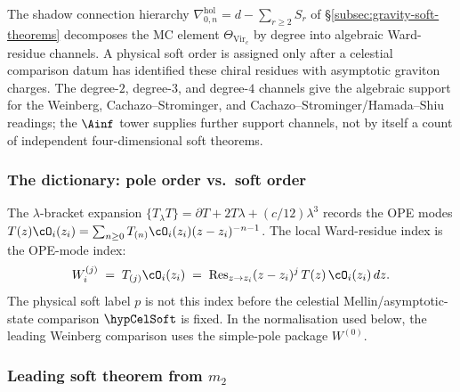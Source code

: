 The shadow connection hierarchy
$\nabla^{\mathrm{hol}}_{0,n} = d - \sum_{r \ge 2} S_r$
of \S\ref{subsec:gravity-soft-theorems}
decomposes the MC element $\Theta_{\mathrm{Vir}_c}$
by degree into algebraic Ward-residue channels. A physical soft
order is assigned only after a celestial comparison datum has
identified these chiral residues with asymptotic graviton charges.
The degree-$2$, degree-$3$, and degree-$4$ channels give the
algebraic support for the Weinberg, Cachazo--Strominger, and
Cachazo--Strominger/Hamada--Shiu readings; the $\Ainf$ tower supplies further
support channels, not by itself a count of independent
four-dimensional soft theorems.

\subsubsection*{The dictionary: pole order vs.\ soft order}

The $\lambda$-bracket expansion
$\{T{}_\lambda T\} = \partial T + 2T\lambda + (c/12)\lambda^3$
records the OPE modes
$T(z)\cO_i(z_i)=\sum_{n\ge0}T_{(n)}\cO_i(z_i)(z-z_i)^{-n-1}$.
The local Ward-residue index is the OPE-mode index:
\begin{equation}\label{eq:gravity-soft-mellin-dictionary}
W^{(j)}_i
\;=\;
T_{(j)}\cO_i(z_i)
\;=\;
\Res_{z \to z_i}
(z - z_i)^j\,T(z)\,\cO_i(z_i)\,dz.
\end{equation}
The physical soft label \(p\) is not this index before the
celestial Mellin/asymptotic-state comparison \(\hypCelSoft\) is fixed. In the
normalisation used below, the leading Weinberg comparison uses the
simple-pole package \(W^{(0)}\).

\subsubsection*{Leading soft theorem from $m_2$}

